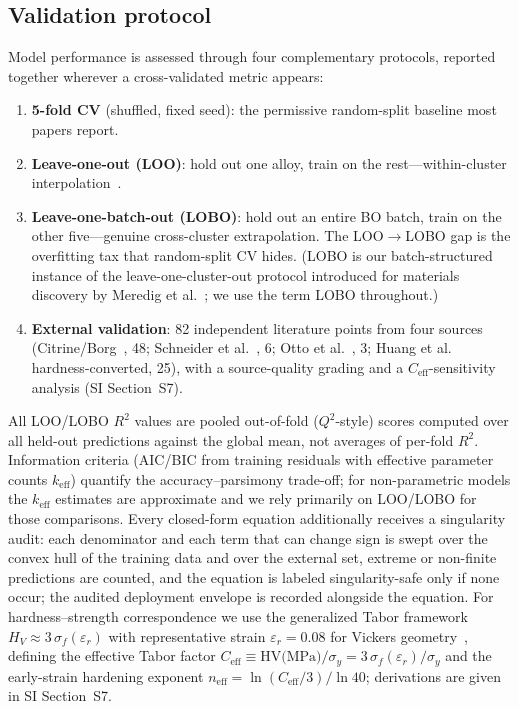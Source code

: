 \documentclass[5p,times,twocolumn]{elsarticle}
\begin{document}
\subsection{Validation protocol}
\label{sec:validation}

Model performance is assessed through four complementary protocols, reported together wherever a cross-validated metric appears:
\begin{enumerate}
  \item \textbf{5-fold CV} (shuffled, fixed seed): the permissive random-split baseline most papers report.
  \item \textbf{Leave-one-out (LOO)}: hold out one alloy, train on the rest---within-cluster interpolation~\cite{Stone1974}.
  \item \textbf{Leave-one-batch-out (LOBO)}: hold out an entire BO batch, train on the other five---genuine cross-cluster extrapolation. The LOO$\to$LOBO gap is the overfitting tax that random-split CV hides. (LOBO is our batch-structured instance of the leave-one-cluster-out protocol introduced for materials discovery by Meredig et al.~\cite{Meredig2018}; we use the term LOBO throughout.)
  \item \textbf{External validation}: 82 independent literature points from four sources (Citrine/Borg~\cite{Borg2020}, 48; Schneider et al.~\cite{Schneider2021}, 6; Otto et al.~\cite{Otto2013}, 3; Huang et al.~\cite{HuangTY2019} hardness-converted, 25), with a source-quality grading and a $C_\text{eff}$-sensitivity analysis (SI Section~S7).
\end{enumerate}
All LOO/LOBO $R^2$ values are pooled out-of-fold ($Q^2$-style) scores computed over all held-out predictions against the global mean, not averages of per-fold $R^2$. Information criteria (AIC/BIC from training residuals with effective parameter counts $k_\text{eff}$) quantify the accuracy--parsimony trade-off; for non-parametric models the $k_\text{eff}$ estimates are approximate and we rely primarily on LOO/LOBO for those comparisons. Every closed-form equation additionally receives a singularity audit: each denominator and each term that can change sign is swept over the convex hull of the training data and over the external set, extreme or non-finite predictions are counted, and the equation is labeled singularity-safe only if none occur; the audited deployment envelope is recorded alongside the equation. For hardness--strength correspondence we use the generalized Tabor framework $H_V \approx 3\,\sigma_f(\varepsilon_r)$ with representative strain $\varepsilon_r = 0.08$ for Vickers geometry~\cite{Tabor1951,Dao2001}, defining the effective Tabor factor $C_\text{eff} \equiv \text{HV(MPa)}/\sigma_y = 3\,\sigma_f(\varepsilon_r)/\sigma_y$ and the early-strain hardening exponent $n_\text{eff} = \ln(C_\text{eff}/3)/\ln 40$; derivations are given in SI Section~S7.
\end{document}
